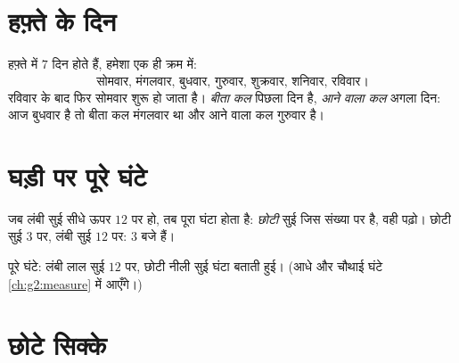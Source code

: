 \section{हफ़्ते के दिन}

\begin{example}[सात दिन]\label{ex:g1:measure:days}
हफ़्ते में $7$ दिन होते हैं, हमेशा एक ही क्रम में:
\[
\text{सोमवार, मंगलवार, बुधवार, गुरुवार, शुक्रवार, शनिवार,
रविवार।}
\]
रविवार के बाद फिर सोमवार शुरू हो जाता है। \emph{बीता कल} पिछला
दिन है, \emph{आने वाला कल} अगला दिन: आज बुधवार है तो बीता कल
मंगलवार था और आने वाला कल गुरुवार है।
\end{example}

\section{घड़ी पर पूरे घंटे}

\begin{method}[पूरा घंटा पढ़ना]\label{met:g1:measure:clock}
जब लंबी सुई सीधे ऊपर $12$ पर हो, तब पूरा घंटा होता है:
\emph{छोटी} सुई जिस संख्या पर है, वही पढ़ो। छोटी सुई
$3$ पर, लंबी सुई $12$ पर: $3$ बजे हैं।
\end{method}

\begin{omfigure}

{\small पूरे घंटे: लंबी लाल सुई $12$ पर, छोटी नीली सुई घंटा
बताती हुई। (आधे और चौथाई घंटे
\cref{ch:g2:measure} में आएँगे।)}
\end{omfigure}

\section{छोटे सिक्के}

